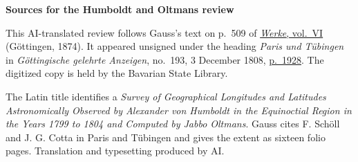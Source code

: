 \clearpage\thispagestyle{empty}
\begin{center}\textbf{Sources for the Humboldt and Oltmans review}\end{center}
\noindent This AI-translated review follows Gauss’s text on p.~509 of \href{https://gdz.sub.uni-goettingen.de/id/PPN236007467}{\textit{Werke}, vol.~VI} (Göttingen, 1874). It appeared unsigned under the heading \emph{Paris und Tübingen} in \textit{Göttingische gelehrte Anzeigen}, no.~193, 3 December 1808, \href{https://api.digitale-sammlungen.de/iiif/image/v2/bsb10538674_00922/full/1800,/0/default.jpg}{p.~1928}. The digitized copy is held by the Bavarian State Library.
\par\smallskip\noindent The Latin title identifies a \emph{Survey of Geographical Longitudes and Latitudes Astronomically Observed by Alexander von Humboldt in the Equinoctial Region in the Years 1799 to 1804 and Computed by Jabbo Oltmans}. Gauss cites F. Schöll and J. G. Cotta in Paris and Tübingen and gives the extent as sixteen folio pages. Translation and typesetting produced by AI.
\clearpage
